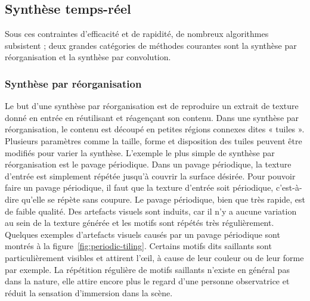 \subsection*{Synthèse temps-réel} %

Sous ces contraintes d'efficacité et de rapidité, de nombreux algorithmes subsistent ; deux grandes catégories de méthodes courantes sont la synthèse par réorganisation et la synthèse par convolution.

\subsubsection{Synthèse par réorganisation}

Le but d'une synthèse par réorganisation est de reproduire un extrait de texture donné en entrée en réutilisant et réagençant son contenu. Dans une synthèse par réorganisation, le contenu est découpé en petites régions connexes dites « tuiles ». Plusieurs paramètres comme la taille, forme et disposition des tuiles peuvent être modifiés pour varier la synthèse. L'exemple le plus simple de synthèse par réorganisation est le pavage périodique. Dans un pavage périodique, la texture d'entrée est simplement répétée jusqu'à couvrir la surface désirée. Pour pouvoir faire un pavage périodique, il faut que la texture d'entrée soit périodique, c'est-à-dire qu'elle se répète sans coupure. Le pavage périodique, bien que très rapide, est de faible qualité. Des artefacts visuels sont induits, car il n'y a aucune variation au sein de la texture générée et les motifs sont répétés très régulièrement. Quelques exemples d'artefacts visuels causés par un pavage périodique sont montrés à la figure~\ref{fig:periodic-tiling}. Certains motifs dits saillants sont particulièrement visibles et attirent l'œil, à cause de leur couleur ou de leur forme par exemple. La répétition régulière de motifs saillants n'existe en général pas dans la nature, elle attire encore plus le regard d'une personne observatrice et réduit la sensation d'immersion dans la scène.

\bigskip

